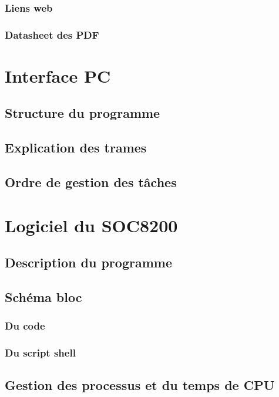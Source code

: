 \documentclass[10pt,a4paper,final]{article}
\begin{document}
\begin{spacing}{1.5}
\subsubsection{Liens web}

\subsubsection{Datasheet des PDF}


\pagebreak
\section{Interface PC}

\subsection{Structure du programme}

\subsection{Explication des trames}

\subsection{Ordre de gestion des tâches}





\pagebreak
\section{Logiciel du SOC8200}
\subsection{Description du programme}

\subsection{Schéma bloc}
\subsubsection{Du code}

\subsubsection{Du script shell}

\subsection{Gestion des processus et du temps de CPU}


\end{spacing}
\end{document}
